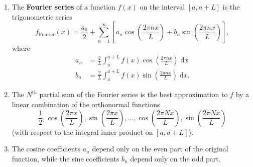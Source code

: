\documentclass{article}
\newcommand{\diff}{\;\mathrm{d}}
\begin{document}
\vspace{5mm}

\begin{enumerate}
	\item The \textbf{Fourier series} of a function $f(x)$ on the interval $[a,a+L]$ is the trigonometric series
		\[f_\mathrm{Fourier}(x)=\frac{a_0}{2}+\sum_{n=1}^\infty \left[a_n\cos\left(\frac{2\pi nx}{L}\right) + b_n\sin\left(\frac{2\pi nx}{L}\right)\right],\]
		where
		\begin{align*}
			a_n &= \frac{2}{L}\int_a^{a+L} f(x)\cos\left(\frac{2\pi nx}{L}\right)\diff x\\
			b_n &= \frac{2}{L}\int_a^{a+L} f(x)\sin\left(\frac{2\pi nx}{L}\right)\diff x.
		\end{align*}
	\item The $N^\mathrm{th}$ partial sum of the Fourier series is the best approximation to $f$ by a linear combination of the orthonormal functions
		\[\frac{1}{2},\cos\left(\frac{2\pi x}{L}\right),\sin\left(\frac{2\pi x}{L}\right),\hdots, \cos\left(\frac{2\pi N x}{L}\right),\sin\left(\frac{2\pi Nx}{L}\right)\]
		(with respect to the integral inner product on $[a,a+L]$).
	\item The cosine coefficients $a_n$ depend only on the even part of the original function, while the sine coefficients $b_n$ depend only on the odd part.
\end{enumerate}
\end{document}
